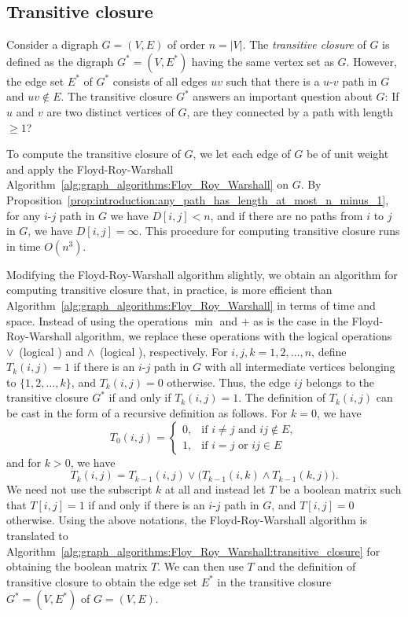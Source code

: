 
\subsection{Transitive closure}

Consider a digraph $G = (V, E)$ of order $n = |V|$. The
\emph{transitive closure} of $G$ is defined
as the digraph $G^* = (V, E^*)$ having the same vertex set as
$G$. However, the edge set $E^*$ of $G^*$ consists of all edges $uv$
such that there is a $u$-$v$ path in $G$ and $uv \notin E$. The
transitive closure $G^*$ answers an important question about $G$: If
$u$ and $v$ are two distinct vertices of $G$, are they connected by a
path with length $\geq 1$?

To compute the transitive closure of $G$, we let each edge of $G$ be
of unit weight and apply the
Floyd-Roy-Warshall
Algorithm~\ref{alg:graph_algorithms:Floy_Roy_Warshall} on $G$. By
Proposition~\ref{prop:introduction:any_path_has_length_at_most_n_minus_1},
for any $i$-$j$ path in $G$ we have $D[i,j] < n$, and if there are no
paths from $i$ to $j$ in $G$, we have $D[i,j] = \infty$. This
procedure for computing transitive closure runs in time $O(n^3)$.

Modifying the Floyd-Roy-Warshall
algorithm slightly, we obtain an
algorithm for computing transitive closure
that, in practice, is more efficient than
Algorithm~\ref{alg:graph_algorithms:Floy_Roy_Warshall} in terms of
time and space. Instead of using the operations $\min$ and $+$ as is
the case in the Floyd-Roy-Warshall
algorithm, we replace these
operations with the logical operations $\vee$~(logical \OR) and
$\wedge$~(logical \AND), respectively. For $i,j,k = 1, 2, \dots, n$,
define $T_k(i,j) = 1$ if there is an $i$-$j$ path in $G$ with all
intermediate vertices belonging to $\{1, 2, \dots, k\}$, and
$T_k(i,j) = 0$ otherwise. Thus, the edge $ij$ belongs to the
transitive closure $G^*$ if and only if $T_k(i,j) = 1$. The definition
of $T_k(i,j)$ can be cast in the form of a recursive definition as
follows. For $k = 0$, we have
\[
T_0(i,j)
=
\begin{cases}
0, & \text{if $i \neq j$ and $ij \notin E$}, \\
1, & \text{if $i = j$ or $ij \in E$}
\end{cases}
\]
and for $k > 0$, we have
\[
T_k(i,j)
=
T_{k-1}(i,j) \vee \big( T_{k-1}(i,k) \wedge T_{k-1}(k,j) \big).
\]
We need not use the subscript $k$ at all and instead let $T$ be a
boolean matrix such that $T[i,j] = 1$ if and only if there is an
$i$-$j$ path in $G$, and $T[i,j] = 0$ otherwise. Using the above
notations, the Floyd-Roy-Warshall
algorithm is translated to
Algorithm~\ref{alg:graph_algorithms:Floy_Roy_Warshall:transitive_closure}
for obtaining the boolean matrix $T$. We can then use $T$ and the
definition of transitive closure to obtain
the edge set $E^*$ in the transitive closure $G^* = (V, E^*)$ of
$G = (V, E)$.

